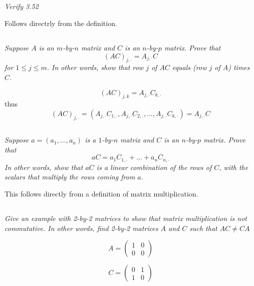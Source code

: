 \documentclass[11pt,oneside,titlepage]{book}
\begin{document}
\subsection{}

\textit{Verify 3.52}

Follows directrly from the definition.

\subsection{}

\textit{Suppose $A$ is an $m$-by-$n$ matrix and $C$ is an $n$-by-$p$ matrix. Prove that }
$$(AC)_{j, \cdot} = A_{j, \cdot}C$$
\textit{for $1 \leq j \leq m$. In other words, show that row $j$ of $AC$ equals (row $j$ of $A$)
  times $C$.}

$$(AC)_{j, k} = A_{j, \cdot} C_{k, \cdot}$$
thus
$$(AC)_{j, \cdot} = (A_{j, \cdot} C_{1, \cdot}, A_{j, \cdot} C_{2, \cdot}, ..., A_{j, \cdot} C_{k, \cdot}) =
A_{j, \cdot} C
$$

\subsection{}

\textit{Suppose $a = (a_1, ..., a_n)$ is a $1$-by-$n$ matrix and $C$ is an $n$-by-$p$ matrix.
  Prove that }
$$aC = a_1 C_{1, \cdot} + ... + a_n C_{n, \cdot}$$
\textit{In other words, show that $aC$ is a linear combination of the rows of $C$,
  with the scalars that multiply the rows coming from $a$.}

This follows directly from a definition of matrix multiplication.

\subsection{}

\textit{Give an example with 2-by-2 matrices to show that matrix multiplication is not
  commutative. In other words, find 2-by-2 matrices $A$ and $C$ such that
  $AC \neq CA$}

$$A =
\begin{pmatrix}
  1 & 0 \\
  0 & 0
\end{pmatrix}
$$

$$C =
\begin{pmatrix}
  0 & 1 \\
  1 & 0
\end{pmatrix}
$$
\end{document}
